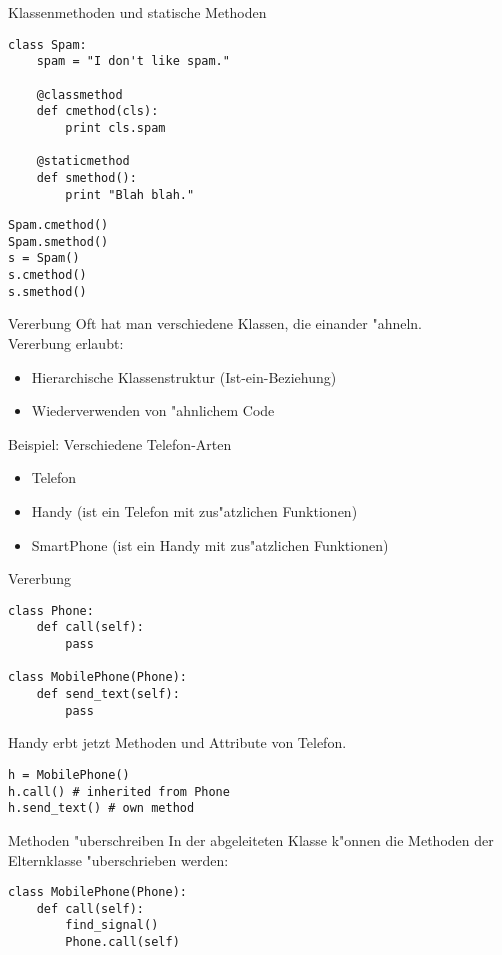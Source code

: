 \begin{frame}[fragile]{Klassenmethoden und statische Methoden}
\begin{lstlisting}[style=Python]
class Spam:
    spam = "I don't like spam."

    @classmethod
    def cmethod(cls):
        print cls.spam
       
    @staticmethod
    def smethod():
        print "Blah blah."
\end{lstlisting}
\begin{lstlisting}[style=Python]
Spam.cmethod()
Spam.smethod()
s = Spam()
s.cmethod()
s.smethod()
\end{lstlisting}
\end{frame}

\begin{frame}{Vererbung}
Oft hat man verschiedene Klassen, die einander "ahneln.\\
\alert{Vererbung} erlaubt:
\begin{itemize}
\item Hierarchische Klassenstruktur (Ist-ein-Beziehung)
\item Wiederverwenden von "ahnlichem Code
\end{itemize}
\vspace{5mm}
Beispiel: Verschiedene Telefon-Arten
\begin{itemize}
\item Telefon
\item Handy (ist ein Telefon mit zus"atzlichen Funktionen)
\item SmartPhone (ist ein Handy mit zus"atzlichen Funktionen)
\end{itemize}
\end{frame}

\begin{frame}[fragile]{Vererbung}
\begin{lstlisting}[style=Python]
class Phone:
    def call(self):
        pass

class MobilePhone(Phone):
    def send_text(self):
        pass
\end{lstlisting}
Handy erbt jetzt Methoden und Attribute von Telefon.
\begin{lstlisting}[style=Python]
h = MobilePhone()
h.call() # inherited from Phone
h.send_text() # own method
\end{lstlisting}
\end{frame}

\begin{frame}[fragile]{Methoden "uberschreiben}
In der abgeleiteten Klasse k"onnen die Methoden der Elternklasse "uberschrieben werden:
\begin{lstlisting}[style=Python]
class MobilePhone(Phone):
    def call(self):
        find_signal()
        Phone.call(self)
\end{lstlisting}
\end{frame}

